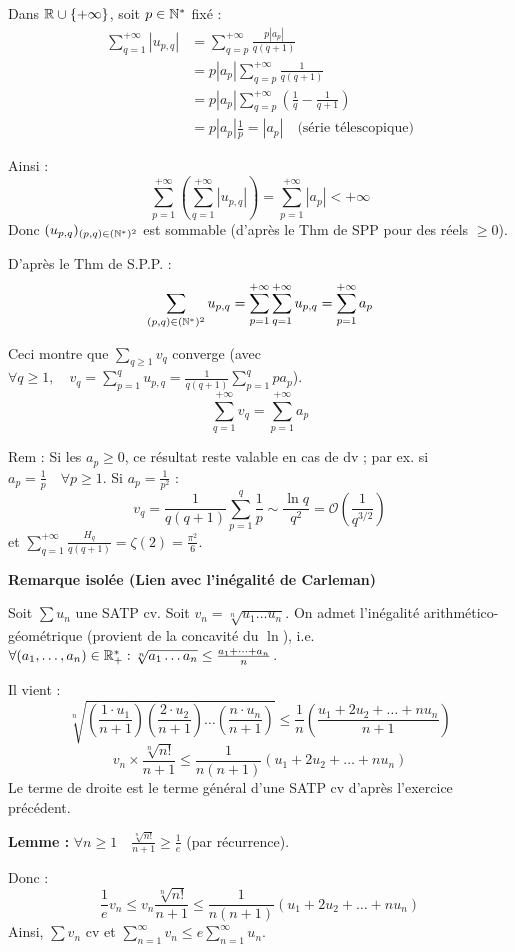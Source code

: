 \begin{solution}
Dans $\mathbb R \cup \{+\infty\}$, soit $p \in \mathbb N^*$ fixé :
\begin{align*}
\sum_{q=1}^{+\infty} |u_{p,q}| &= \sum_{q=p}^{+\infty} \frac{p |a_p|}{q(q+1)} \\
&= p |a_p| \sum_{q=p}^{+\infty} \frac{1}{q(q+1)} \\
&= p |a_p| \sum_{q=p}^{+\infty} \left( \frac{1}{q} - \frac{1}{q+1} \right) \\
&= p |a_p| \frac{1}{p} = |a_p| \quad \text{(série télescopique)}
\end{align*}

Ainsi :
\[ \sum_{p=1}^{+\infty} \left( \sum_{q=1}^{+\infty} |u_{p,q}| \right) = \sum_{p=1}^{+\infty} |a_p| < +\infty \]
Donc $(u_{p,q})_{(p,q)\in(\mathbb N^*)^2}$ est sommable (d'après le Thm de SPP pour des réels $\geq 0$).

D'après le Thm de S.P.P. :
\[ \sum_{(p,q)\in(\mathbb N^*)^2} u_{p,q} = \sum_{p=1}^{+\infty} \sum_{q=1}^{+\infty} u_{p,q} = \sum_{p=1}^{+\infty} a_p \]

Ceci montre que $\sum_{q \geq 1} v_q$ converge (avec $\forall q \geq 1, \quad v_q = \sum_{p=1}^q u_{p,q} = \frac{1}{q(q+1)} \sum_{p=1}^q p a_p$).
\[ \sum_{q=1}^{+\infty} v_q = \sum_{p=1}^{+\infty} a_p \]

\begin{remarkbox}
Rem : Si les $a_p \geq 0$, ce résultat reste valable en cas de dv ; par ex. si $a_p = \frac{1}{p} \quad \forall p \geq 1$.
Si $a_p = \frac{1}{p^2}$ :
\[ v_q = \frac{1}{q(q+1)} \sum_{p=1}^q \frac{1}{p} \sim \frac{\ln q}{q^2} = \mathcal{O}\left(\frac{1}{q^{3/2}}\right) \]
et $\sum_{q=1}^{+\infty} \frac{H_q}{q(q+1)} = \zeta(2) = \frac{\pi^2}{6}$.
\end{remarkbox}
\end{solution}

\begin{remarkbox}
\textbf{Remarque isolée (Lien avec l'inégalité de Carleman)}

Soit $\sum u_n$ une SATP cv. Soit $v_n = \sqrt[n]{u_1 \dots u_n}$.
On admet l'inégalité arithmético-géométrique (provient de la concavité du $\ln$), i.e. $\forall (a_1, \dots, a_n) \in \mathbb R_+^* : \sqrt[n]{a_1 \dots a_n} \leq \frac{a_1 + \dots + a_n}{n}$.

Il vient :
\[ \sqrt[n]{ \left(\frac{1 \cdot u_1}{n+1}\right) \left(\frac{2 \cdot u_2}{n+1}\right) \dots \left(\frac{n \cdot u_n}{n+1}\right) } \leq \frac{1}{n} \left( \frac{u_1 + 2u_2 + \dots + n u_n}{n+1} \right) \]
\[ v_n \times \frac{\sqrt[n]{n!}}{n+1} \leq \frac{1}{n(n+1)} (u_1 + 2u_2 + \dots + n u_n) \]
Le terme de droite est le terme général d'une SATP cv d'après l'exercice précédent.

\textbf{Lemme :} $\forall n \geq 1 \quad \frac{\sqrt[n]{n!}}{n+1} \geq \frac{1}{e}$ (par récurrence).

Donc :
\[ \frac{1}{e} v_n \leq v_n \frac{\sqrt[n]{n!}}{n+1} \leq \frac{1}{n(n+1)}(u_1 + 2u_2 + \dots + n u_n) \]
Ainsi, $\sum v_n$ cv et $\sum_{n=1}^\infty v_n \leq e \sum_{n=1}^\infty u_n$.
\end{remarkbox}

